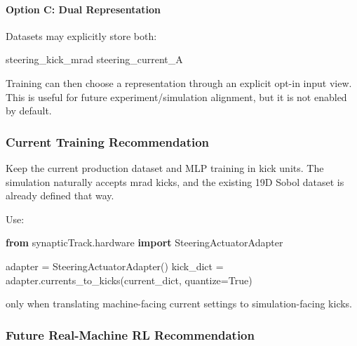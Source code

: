 \documentclass[
]{article}
\newenvironment{Shaded}{}{}
\newcommand{\ImportTok}[1]{\textcolor[rgb]{0.00,0.50,0.00}{\textbf{#1}}}
\newcommand{\NormalTok}[1]{#1}
\newcommand{\OperatorTok}[1]{\textcolor[rgb]{0.40,0.40,0.40}{#1}}
\newcommand{\VariableTok}[1]{\textcolor[rgb]{0.10,0.09,0.49}{#1}}
\begin{document}
\hypertarget{option-c-dual-representation}{%
\paragraph{Option C: Dual
Representation}\label{option-c-dual-representation}}

Datasets may explicitly store both:

\begin{Shaded}
\begin{Highlighting}[]
\NormalTok{steering\_kick\_mrad}
\NormalTok{steering\_current\_A}
\end{Highlighting}
\end{Shaded}

Training can then choose a representation through an explicit opt-in
input view. This is useful for future experiment/simulation alignment,
but it is not enabled by default.

\hypertarget{current-training-recommendation}{%
\subsubsection{Current Training
Recommendation}\label{current-training-recommendation}}

Keep the current production dataset and MLP training in kick units. The
simulation naturally accepts mrad kicks, and the existing 19D Sobol
dataset is already defined that way.

Use:

\begin{Shaded}
\begin{Highlighting}[]
\ImportTok{from}\NormalTok{ synapticTrack.hardware }\ImportTok{import}\NormalTok{ SteeringActuatorAdapter}

\NormalTok{adapter }\OperatorTok{=}\NormalTok{ SteeringActuatorAdapter()}
\NormalTok{kick\_dict }\OperatorTok{=}\NormalTok{ adapter.currents\_to\_kicks(current\_dict, quantize}\OperatorTok{=}\VariableTok{True}\NormalTok{)}
\end{Highlighting}
\end{Shaded}

only when translating machine-facing current settings to
simulation-facing kicks.

\hypertarget{future-real-machine-rl-recommendation}{%
\subsubsection{Future Real-Machine RL
Recommendation}\label{future-real-machine-rl-recommendation}}
\end{document}
